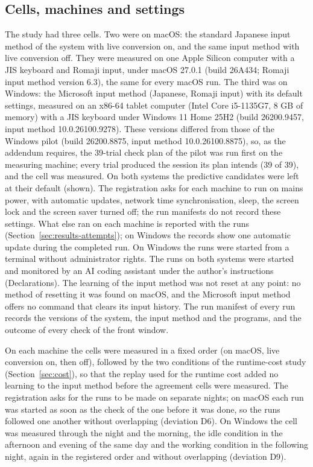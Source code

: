 

\subsection{Cells, machines and settings}
\label{sec:method-cells}

The study had three cells. Two were on macOS: the standard Japanese input method of the system with live conversion
on, and the same input method with live conversion off. They were measured on one Apple Silicon computer with a JIS
keyboard and Romaji input, under macOS 27.0.1 (build 26A434; Romaji input method version 6.3), the same for every
macOS run. The third was on Windows: the Microsoft
input method (Japanese, Romaji input) with its default settings, measured on an x86-64 tablet computer (Intel Core
i5-1135G7, 8 GB of memory) with a JIS keyboard under Windows 11 Home 25H2 (build 26200.9457, input method
10.0.26100.9278). These versions differed from those of the Windows pilot (build 26200.8875, input method
10.0.26100.8875), so, as the addendum requires, the 39-trial check plan of the pilot was run first on the measuring
machine; every trial produced the session its plan intends (39 of 39), and the cell was measured. On both systems the
predictive candidates were left at their default (shown). The registration asks for each machine to run on mains power,
with automatic updates, network time synchronisation, sleep, the screen lock and the screen saver turned off; the run
manifests do not record these settings. What else ran on each machine is reported with the runs
(Section~\ref{sec:results-attempts}); on Windows the records show one automatic update during the completed run. On
Windows the runs were started from a terminal without administrator rights. The runs on both systems were started and
monitored by an AI coding assistant under the author's instructions (Declarations). The learning of the input method
was not reset at any point: no method of resetting it was found on macOS, and the Microsoft input method offers no
command that clears its input history. The run manifest of every run records the versions of the system, the input
method and the programs, and the outcome of every check of the front window.

On each machine the cells were measured in a fixed order (on macOS, live conversion on, then off), followed by the two
conditions of the runtime-cost study (Section~\ref{sec:cost}), so that the replay used for the runtime cost added no
learning to the input method before the agreement cells were measured. The registration asks for the runs to be made
on separate nights; on macOS each run was started as soon as the check of the one before it was done, so the runs
followed one another without overlapping (deviation D6). On Windows the cell was measured through the night and the
morning, the idle condition in the afternoon and evening of the same day and the working condition in the following
night, again in the registered order and without overlapping (deviation D9).

